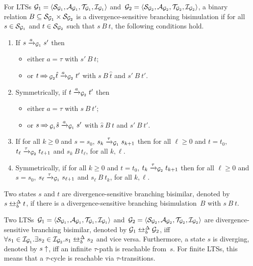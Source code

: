 \begin{definition}
\label{def:lts-transformation:dsbbsim}
For LTSs $\graph_1 = \ltstuple{\graph_1}$ and~$\graph_2 = \ltstuple{\graph_2}$, a binary relation $B \subseteq \states{\graph_1} \times \states{\graph_2} $ is a divergence-sensitive branching bisimulation if for all $s \in \states{\graph_1}$ and $t \in \states{\graph_2}$ such that $s\ B\ t$, the following conditions hold.
\begin{enumerate}
\item If $s \xrightarrow{a}_{\mathcal{G}_1} s'$ then
  \begin{itemize}
  \item either $a=\tau$ with $s'\ B\ t$;
  \item or $t \tausteps_{\graph_2} {\hat t} \xrightarrow{a}_{\graph_2} t'$ with $s\ B\ {\hat t}$ and $s'\ B\ t'$.
  \end{itemize}
\item Symmetrically, if $t \xrightarrow{a}_{\mathcal{G}_2} t'$ then
  \begin{itemize}
  \item either $a=\tau$ with $s\ B\ t'$;
  \item or $s \tausteps_{\graph_1} {\hat s} \xrightarrow{a}_{\graph_1} s'$ with ${\hat s}\ B\ t$ and $s'\ B\ t'$.
  \end{itemize}
\item If for all $k\geq 0$ and $s=s_0$, $s_k \xrightarrow{\tau}_{\mathcal{G}_1} s_{k+1}$ then for all $\ell\geq 0$ and $t=t_0$, $t_\ell \xrightarrow{\tau}_{\mathcal{G}_2} t_{\ell+1}$ and $s_k\ B\ t_{\ell}$, for all $k, \ell$.
\item Symmetrically, if for all $k\geq 0$ and $t=t_0$, $t_k \xrightarrow{\tau}_{\mathcal{G}_2} t_{k+1}$ then for all $\ell\geq 0$ and $s=s_0$, $s_\ell \xrightarrow{\tau}_{\mathcal{G}_1} s_{\ell+1}$ and $s_{\ell}\ B\ t_k$, for all $k, \ell$.
\end{enumerate}
Two states $s$ and $t$ are divergence-sensitive branching bisimilar, denoted by $s\dsbbis t$, if there is a divergence-sensitive branching bisimulation~$B$ with $s\ B\ t$.
\end{definition}

Two LTSs~$\graph_1 = \ltstuple{\graph_1}$ and~$\graph_2 = \ltstuple{\graph_2}$ are divergence-sensitive branching bisimilar, denoted by $\graph_1 \dsbbis \graph_2$, iff $\forall s_1 \in \initialstates{\graph_1}. \exists s_2 \in \initialstates{\graph_2}. s_1 \dsbbis s_2$ and vice versa.
Furthermore, a state $s$ is diverging, denoted by $s\uparrow$, iff an infinite $\tau$-path is reachable from~$s$.
For finite LTSs, this means that a $\tau$-cycle is reachable via $\tau$-transitions.

